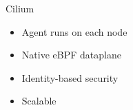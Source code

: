 \documentclass[black,white]{beamer}
\DeclareRobustCommand{\#}{\adjustbox{valign=B,totalheight=.57\baselineskip}{\oldhash}}%
\begin{document}
    \begin{frame}{Cilium}
        \begin{table}
            \begin{subtable}[l]{0.45\textwidth}
                \begin{itemize}
                    \item Agent runs on each node \medskip
                    \item Native eBPF dataplane \medskip
                    \item Identity-based security \medskip
                    \item Scalable \medskip
                \end{itemize}
            \end{subtable}
            \begin{subtable}[r]{0.5\textwidth}

\end{subtable}
\end{table}
\end{frame}
\end{document}
